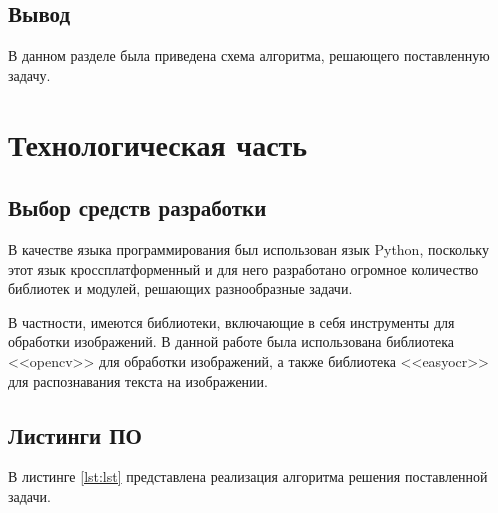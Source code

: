 \documentclass[12pt]{report}
\begin{document}
\section*{Вывод}
В данном разделе была приведена схема алгоритма, решающего поставленную задачу.

\chapter{Технологическая часть}

\section{Выбор средств разработки}
В качестве языка программирования был использован язык Python, поскольку этот язык кроссплатформенный и для него разработано огромное количество библиотек и модулей, решающих разнообразные задачи. 

В частности, имеются библиотеки, включающие в себя инструменты для обработки изображений. В данной работе была использована библиотека <<opencv>> \cite{bib:opencv} для обработки изображений, а также библиотека  <<easyocr>> \cite{bib:easyocr} для распознавания текста на изображении.

\section{Листинги ПО}

В листинге \ref{lst:lst} представлена реализация алгоритма решения поставленной задачи.
\end{document}
